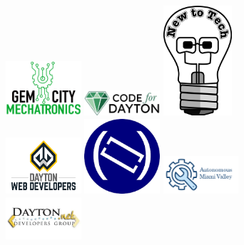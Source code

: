 \documentclass[14pt]{extarticle}
\author{}
\date{}
\begin{document}




\ifdefined\Shaded\renewenvironment{Shaded}{\begin{tcolorbox}[boxrule=0pt, frame hidden, interior hidden, breakable, borderline west={3pt}{0pt}{shadecolor}, enhanced, sharp corners]}{\end{tcolorbox}}\fi

\thispagestyle{empty}
 \begin{figure}
    \includegraphics[width=1.1in]{img/GemCityMechatronicsLogo_Transparent.png}
    \includegraphics[width=1.1in]{img/CodeForDayton.png}
    \includegraphics[width=1.0in]{img/New_To_Tech_Mascot.png}
  \includegraphics[width=1.1in]{img/Dayton_Web_Developers.png}
  \includegraphics[width=1.1in]{img/DDLLogo.png}
  \includegraphics[width=1.1in]{img/AutonomousMiamiValleyLogo.png}
    \includegraphics[width=1.1in]{img/DaytonDotNet.png}

\end{figure}
\end{document}
